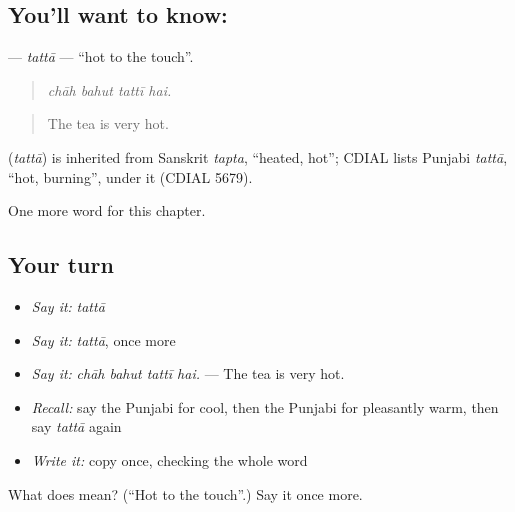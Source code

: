 \subsection*{You'll want to know: }
\textbf{} — \emph{tattā} — \textquotedblleft{}hot to the touch\textquotedblright{}.

\begin{quote}
   
\end{quote}

\begin{quote}
\emph{chāh bahut tattī hai.}
\end{quote}

\begin{quote}
The tea is very hot.
\end{quote}

\begin{cousinweb}
\textbf{} (\emph{tattā}) is inherited from Sanskrit \emph{tapta}, \textquotedblleft{}heated, hot\textquotedblright{}; CDIAL lists Punjabi \emph{tattā}, \textquotedblleft{}hot, burning\textquotedblright{}, under it (CDIAL 5679).
\end{cousinweb}

\begin{grammarlens}[title={What you've built}]
One more word for this chapter.
\end{grammarlens}

\subsection*{Your turn}
\begin{itemize}
\raggedright
  \item \emph{Say it:} \emph{tattā}
  \item \emph{Say it:} \emph{tattā}, once more
  \item \emph{Say it:} \emph{chāh bahut tattī hai.} — The tea is very hot.
  \item \emph{Recall:} say the Punjabi for cool, then the Punjabi for pleasantly warm, then say \emph{tattā} again
  \item \emph{Write it:} copy \textbf{} once, checking the whole word
\end{itemize}

\begin{tcolorbox}[breakable,colback=teal!4,colframe=teal!35!black,title={Before you move on}]
What does  mean? (\textquotedblleft{}Hot to the touch\textquotedblright{}.) Say it once more.
\end{tcolorbox}

